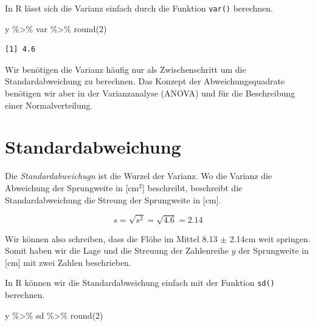 \documentclass[
  letterpaper,
]{scrbook}
\newenvironment{Shaded}{\begin{snugshade}}{\end{snugshade}}
\newcommand{\DecValTok}[1]{\textcolor[rgb]{0.68,0.00,0.00}{#1}}
\newcommand{\FunctionTok}[1]{\textcolor[rgb]{0.28,0.35,0.67}{#1}}
\newcommand{\NormalTok}[1]{\textcolor[rgb]{0.00,0.23,0.31}{#1}}
\newcommand{\SpecialCharTok}[1]{\textcolor[rgb]{0.37,0.37,0.37}{#1}}
\begin{document}
In R lässt sich die Varianz einfach durch die Funktion \texttt{var()}
berechnen.

\begin{Shaded}
\begin{Highlighting}[]
\NormalTok{y }\SpecialCharTok{\%\textgreater{}\%}\NormalTok{ var }\SpecialCharTok{\%\textgreater{}\%} \FunctionTok{round}\NormalTok{(}\DecValTok{2}\NormalTok{) }
\end{Highlighting}
\end{Shaded}

\begin{verbatim}
[1] 4.6
\end{verbatim}

Wir benötigen die Varianz häufig nur als Zwischenschritt um die
Standardabweichung zu berechnen. Das Konzept der Abweichungsquadrate
benötigen wir aber in der Varianzanalyse (ANOVA) und für die
Beschreibung einer Normalverteilung.

\hypertarget{standardabweichung}{%
\section{Standardabweichung}\label{standardabweichung}}

Die \emph{Standardabweichugn} ist die Wurzel der Varianz. Wo die Varianz
die Abweichung der Sprungweite in {[}cm\(^2\){]} beschreibt, beschreibt
die Standardabweichung die Streung der Sprungweite in {[}cm{]}.

\[
s = \sqrt{s^2} = \sqrt{4.6} = 2.14
\] {}

Wir können also schreiben, dass die Flöhe im Mittel 8.13 \(\pm\) 2.14cm
weit springen. Somit haben wir die Lage und die Streuung der Zahlenreihe
\(y\) der Sprungweite in {[}cm{]} mit zwei Zahlen beschrieben.

In R können wir die Standardabweichung einfach mit der Funktion
\texttt{sd()} berechnen.

\begin{Shaded}
\begin{Highlighting}[]
\NormalTok{y }\SpecialCharTok{\%\textgreater{}\%}\NormalTok{ sd }\SpecialCharTok{\%\textgreater{}\%} \FunctionTok{round}\NormalTok{(}\DecValTok{2}\NormalTok{) }
\end{Highlighting}
\end{Shaded}
\end{document}
